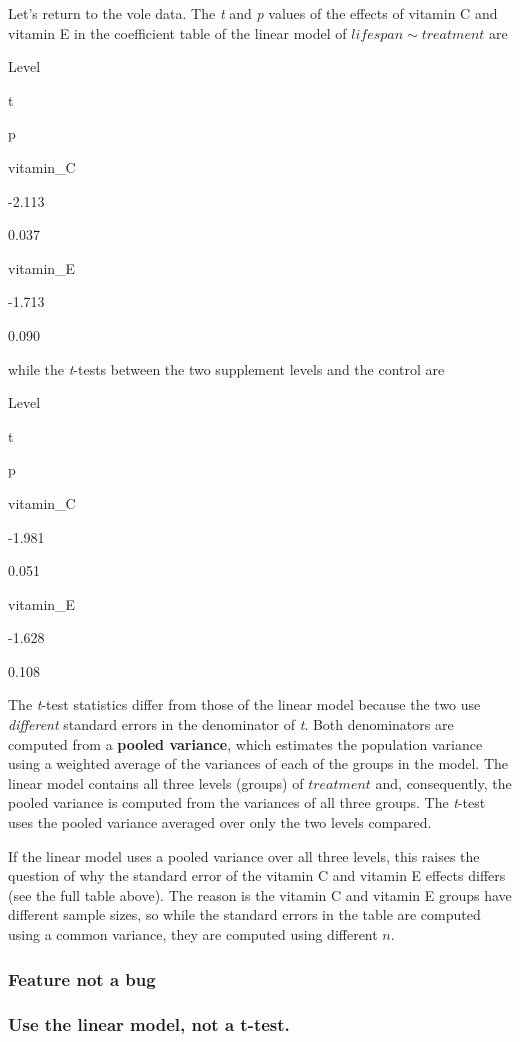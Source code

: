 \documentclass[]{book}
\begin{document}
Let's return to the vole data. The \emph{t} and \emph{p} values of the
effects of vitamin C and vitamin E in the coefficient table of the
linear model of \(lifespan \sim treatment\) are

Level

t

p

vitamin\_C

-2.113

0.037

vitamin\_E

-1.713

0.090

while the \emph{t}-tests between the two supplement levels and the
control are

Level

t

p

vitamin\_C

-1.981

0.051

vitamin\_E

-1.628

0.108

The \emph{t}-test statistics differ from those of the linear model
because the two use \emph{different} standard errors in the denominator
of \emph{t}. Both denominators are computed from a \textbf{pooled
variance}, which estimates the population variance using a weighted
average of the variances of each of the groups in the model. The linear
model contains all three levels (groups) of \(treatment\) and,
consequently, the pooled variance is computed from the variances of all
three groups. The \emph{t}-test uses the pooled variance averaged over
only the two levels compared.

If the linear model uses a pooled variance over all three levels, this
raises the question of why the standard error of the vitamin C and
vitamin E effects differs (see the full table above). The reason is the
vitamin C and vitamin E groups have different sample sizes, so while the
standard errors in the table are computed using a common variance, they
are computed using different \(n\).

\subsubsection{Feature not a bug}\label{feature-not-a-bug}

\subsubsection{Use the linear model, not a
t-test.}\label{use-the-linear-model-not-a-t-test.}
\end{document}

